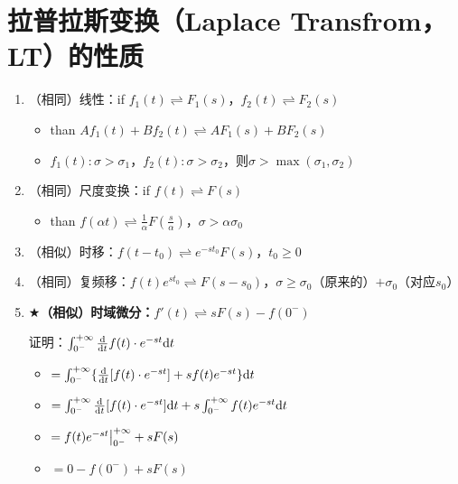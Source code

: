 \documentclass[UTF8]{ctexart}
\begin{document}
\section{拉普拉斯变换（Laplace Transfrom，LT）的性质}
\begin{enumerate}[label=(\arabic*),itemindent=0pt,labelindent=\parindent,labelwidth=2em,labelsep=5pt,leftmargin=*]
      \item （相同）线性：if $f_1(t)\rightleftharpoons{F_1(s)}$，$f_2(t)\rightleftharpoons{F_2(s)}$ \par
            \begin{itemize}[label=,left=6em]
              \item than $Af_1(t)+Bf_2(t)\rightleftharpoons{AF_1(s)}+BF_2(s)$
              \item $f_1(t):\sigma>\sigma_1$，$f_2(t):\sigma>\sigma_2$，则$\sigma>\max(\sigma_1,\sigma_2)$
            \end{itemize}
      \item （相同）尺度变换：if $f(t)\rightleftharpoons{F(s)}$ \par
            \begin{itemize}[label=,left=8em]
              \item than $f(\alpha{t})\rightleftharpoons\frac{1}{\alpha}{F(\frac{s}{\alpha})}$，$\sigma>\alpha\sigma_0$
            \end{itemize}
      \item （相似）时移：$f(t-{t_0})\rightleftharpoons{e^{-st_0}F(s)}$，$t_0\geqslant0$
      \item （相同）复频移：$f(t)e^{st_0}\rightleftharpoons{F(s-s_0)}$，$\sigma\geqslant\sigma_0$（原来的）$+\sigma_0$（对应$s_0$）
      \item $\bigstar$\textbf{（相似）时域微分：}$f'(t)\rightleftharpoons{sF(s)-f(0^-)}$ \par
            证明：$\int_{0^-}^{+\infty}\frac{{\rm{d}}}{{\rm{d}}t}f(t)\cdot{e^{-st}}{\rm{d}}t$
            \begin{itemize}[label=,left=2.5em]
              \item $=\int_{0^-}^{+\infty}\{\frac{{\rm{d}}}{{\rm{d}}t}[f(t)\cdot{e^{-st}}]+sf(t)e^{-st}\}{\rm{d}}t$
              \item $=\int_{0^-}^{+\infty}\frac{{\rm{d}}}{{\rm{d}}t}[f(t)\cdot{e^{-st}}]{\rm{d}}t+s\int_{0^-}^{+\infty}f(t)e^{-st}{\rm{d}}t$
              \item $=f(t)e^{-st}\big{|}_{0^-}^{+\infty}+sF(s)$
              \item $=0-f(0^-)+sF(s)$

\end{itemize}
\end{enumerate}
\end{document}
